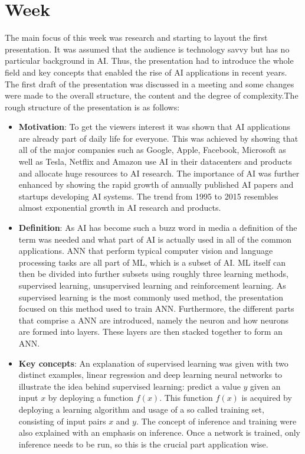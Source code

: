 \chapter{Week}
The main focus of this week was research and starting to layout the first presentation. It was assumed that the audience is technology savvy but has no particular background in \ac{AI}. Thus, the presentation had to introduce the whole field and key concepts that enabled the rise of \ac{AI} applications in recent years. The first draft of the presentation was discussed in a meeting and some changes were made to the overall structure, the content and the degree of complexity.The rough structure of the presentation is as follows:
\begin{itemize}
	\item \textbf{Motivation}: To get the viewers interest it was shown that \ac{AI} applications are already part of daily life for everyone. This was achieved by showing that all of the major companies such as Google, Apple, Facebook, Microsoft as well as Tesla, Netflix and Amazon use \ac{AI} in their datacenters and products and allocate huge resources to \ac{AI} research. The importance of \ac{AI} was further enhanced by showing the rapid growth of annually published \ac{AI} papers and startups developing \ac{AI} systems. The trend from 1995 to 2015 resembles almost exponential growth in \ac{AI} research and products.
	\item \textbf{Definition}: As \ac{AI} has become such a buzz word in media a definition of the term was needed and what part of \ac{AI} is actually used in all of the common applications. \ac{ANN} that perform typical computer vision and language processing tasks are all part of \ac{ML}, which is a subset of \ac{AI}. \ac{ML} itself can then be divided into further subsets using roughly three learning methods, supervised learning, unsupervised learning and reinforcement learning. As supervised learning is the most commonly used method, the presentation focused on this method used to train \ac{ANN}. Furthermore, the different parts that comprise a \ac{ANN} are introduced, namely the neuron and how neurons are formed into layers. These layers are then stacked together to form an \ac{ANN}.
	\item \textbf{Key concepts}: An explanation of supervised learning was given with two distinct examples, linear regression and deep learning neural networks to illustrate the idea behind supervised learning: predict a value $y$ given an input $x$ by deploying a function $f(x)$. This function $f(x)$ is acquired by deploying a learning algorithm and usage of a so called training set, consisting of input pairs $x$ and $y$. The concept of inference and training were also explained with an emphasis on inference. Once a network is trained, only inference needs to be run, so this is the crucial part application wise.

\end{itemize}
